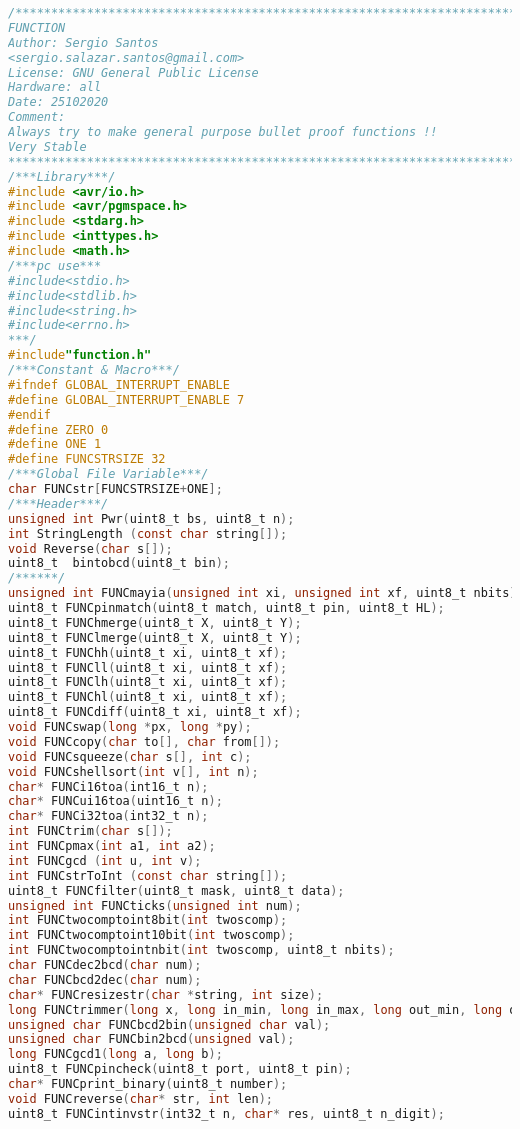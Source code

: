 \begin{lstlisting}[language=C, caption={function.c}, label=function-c, captionpos=b]
/*************************************************************************
FUNCTION
Author: Sergio Santos
<sergio.salazar.santos@gmail.com> 
License: GNU General Public License
Hardware: all
Date: 25102020
Comment:
Always try to make general purpose bullet proof functions !!
Very Stable
*************************************************************************/
/***Library***/
#include <avr/io.h>
#include <avr/pgmspace.h>
#include <stdarg.h>
#include <inttypes.h>
#include <math.h>
/***pc use***
#include<stdio.h>
#include<stdlib.h>
#include<string.h>
#include<errno.h>
***/
#include"function.h"
/***Constant & Macro***/
#ifndef GLOBAL_INTERRUPT_ENABLE
#define GLOBAL_INTERRUPT_ENABLE 7
#endif
#define ZERO 0
#define ONE 1
#define FUNCSTRSIZE 32
/***Global File Variable***/
char FUNCstr[FUNCSTRSIZE+ONE];
/***Header***/
unsigned int Pwr(uint8_t bs, uint8_t n);
int StringLength (const char string[]);
void Reverse(char s[]);
uint8_t  bintobcd(uint8_t bin);
/******/
unsigned int FUNCmayia(unsigned int xi, unsigned int xf, uint8_t nbits);
uint8_t FUNCpinmatch(uint8_t match, uint8_t pin, uint8_t HL);
uint8_t FUNChmerge(uint8_t X, uint8_t Y);
uint8_t FUNClmerge(uint8_t X, uint8_t Y);
uint8_t FUNChh(uint8_t xi, uint8_t xf);
uint8_t FUNCll(uint8_t xi, uint8_t xf);
uint8_t FUNClh(uint8_t xi, uint8_t xf);
uint8_t FUNChl(uint8_t xi, uint8_t xf);
uint8_t FUNCdiff(uint8_t xi, uint8_t xf);
void FUNCswap(long *px, long *py);
void FUNCcopy(char to[], char from[]);
void FUNCsqueeze(char s[], int c);
void FUNCshellsort(int v[], int n);
char* FUNCi16toa(int16_t n);
char* FUNCui16toa(uint16_t n);
char* FUNCi32toa(int32_t n);
int FUNCtrim(char s[]);
int FUNCpmax(int a1, int a2);
int FUNCgcd (int u, int v);
int FUNCstrToInt (const char string[]);
uint8_t FUNCfilter(uint8_t mask, uint8_t data);
unsigned int FUNCticks(unsigned int num);
int FUNCtwocomptoint8bit(int twoscomp);
int FUNCtwocomptoint10bit(int twoscomp);
int FUNCtwocomptointnbit(int twoscomp, uint8_t nbits);
char FUNCdec2bcd(char num);
char FUNCbcd2dec(char num);
char* FUNCresizestr(char *string, int size);
long FUNCtrimmer(long x, long in_min, long in_max, long out_min, long out_max);
unsigned char FUNCbcd2bin(unsigned char val);
unsigned char FUNCbin2bcd(unsigned val);
long FUNCgcd1(long a, long b);
uint8_t FUNCpincheck(uint8_t port, uint8_t pin);
char* FUNCprint_binary(uint8_t number);
void FUNCreverse(char* str, int len);
uint8_t FUNCintinvstr(int32_t n, char* res, uint8_t n_digit);

\end{lstlisting}
